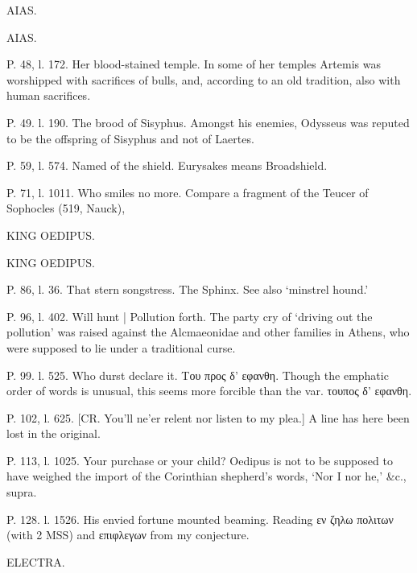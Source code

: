 \documentclass[11pt,letter]{book}
\begin{document}
\par  [page 314]AIAS.

\par  [page 314]AIAS.

\par  P. 48, l. 172. Her blood-stained temple. In some of her temples Artemis was worshipped with sacrifices of bulls, and, according to an old tradition, also with human sacrifices.

\par  P. 49. l. 190. The brood of Sisyphus. Amongst his enemies, Odysseus was reputed to be the offspring of Sisyphus and not of Laertes.

\par  P. 59, l. 574. Named of the shield. Eurysakes means Broadshield.

\par  P. 71, l. 1011. Who smiles no more. Compare a fragment of the Teucer of Sophocles (519, Nauck),
 
\par  KING OEDIPUS.

\par  KING OEDIPUS.

\par  P. 86, l. 36. That stern songstress. The Sphinx. See also ‘minstrel hound.’

\par  P. 96, l. 402. Will hunt | Pollution forth. The party cry of ‘driving out the pollution’ was raised against the Alcmaeonidae and other families in Athens, who were supposed to lie under a traditional curse.

\par  P. 99. l. 525. Who durst declare it. Του προς δ’ εφανθη. Though the emphatic order of words is unusual, this seems more forcible than the var. τουπος δ’ εφανθη.

\par  P. 102, l. 625. [CR. You’ll ne’er relent nor listen to my plea.] A line has here been lost in the original.

\par  P. 113, l. 1025. Your purchase or your child? Oedipus is not to be supposed to have weighed the import of the Corinthian shepherd’s words, ‘Nor I nor he,’ &c., supra.

\par  P. 128. l. 1526. His envied fortune mounted beaming. Reading εν ζηλω πολιτων (with 2 MSS) and επιφλεγων from my conjecture.

\par  ELECTRA.
\end{document}
